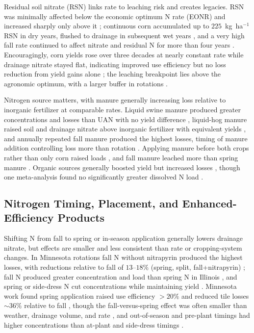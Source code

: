 Residual soil nitrate (RSN) links rate to leaching risk and creates
legacies. RSN was minimally affected below the economic optimum N rate (EONR)
and increased sharply only above it \parencite{Bandura2025}; continuous corn
accumulated up to $225$~kg~ha$^{-1}$ RSN in dry years, flushed to drainage in
subsequent wet years \parencite{Randall2001}, and a very high fall rate
continued to affect nitrate and residual N for more than four years
\parencite{Jaynes2015}. Encouragingly, corn yields rose over three decades at
nearly constant rate while drainage nitrate stayed flat, indicating improved
use efficiency but no loss reduction from yield gains alone
\parencite{Clifford2023}; the leaching breakpoint lies above the agronomic
optimum, with a larger buffer in rotations \parencite{Pasley2021}.

Nitrogen source matters, with manure generally increasing loss relative to
inorganic fertilizer at comparable rates. Liquid swine manure produced
greater concentrations and losses than UAN with no yield difference
\parencite{Bakhsh2005}, liquid-hog manure raised soil and drainage nitrate
above inorganic fertilizer with equivalent yields \parencite{Elmi2005}, and
annually repeated fall manure produced the highest losses, timing of manure
addition controlling loss more than rotation \parencite{HernandezRamirez2011}.
Applying manure before both crops rather than only corn raised loads
\parencite{Dougherty2020}, and fall manure leached more than spring manure
\parencite{Bakhsh2007,Rekha2011}. Organic sources generally boosted yield but
increased losses \parencite{Liu2021}, though one meta-analysis found no
significantly greater dissolved N load \parencite{Christianson2015b}.

\subsection{Nitrogen Timing, Placement, and Enhanced-Efficiency Products}

Shifting N from fall to spring or in-season application generally lowers
drainage nitrate, but effects are smaller and less consistent than rate or
cropping-system changes. In Minnesota rotations fall N without nitrapyrin
produced the highest losses, with reductions relative to fall of
$13$--$18\%$ (spring, split, fall+nitrapyrin) \parencite{Randall2003,Randall2005};
fall N produced greater concentration and load than spring N in Illinois
\parencite{Gentry2024}, and spring or side-dress N cut concentrations while
maintaining yield \parencite{Pittelkow2017,Vetsch2019}. Minnesota work found
spring application raised use efficiency $>20\%$ and reduced tile losses
$\sim36\%$ relative to fall \parencite{Dinnes2002}, though the fall-versus-spring
effect was often smaller than weather, drainage volume, and rate
\parencite{Liu2021}, and out-of-season and pre-plant timings had higher
concentrations than at-plant and side-dress timings \parencite{Hertzberger2019}.

